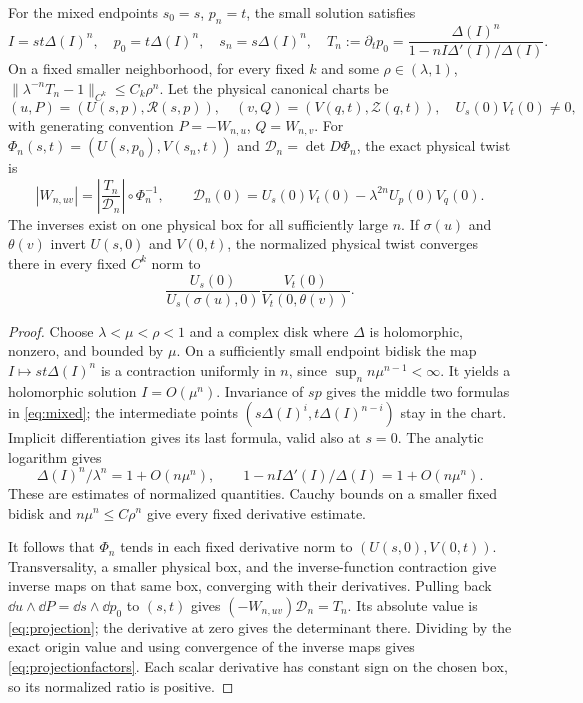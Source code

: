 \begin{proposition}\label{prop:normalform}
For the mixed endpoints $s_0=s$, $p_n=t$, the small solution satisfies
\begin{equation}\label{eq:mixed}
 I=st\Delta(I)^n,\quad p_0=t\Delta(I)^n,\quad
 s_n=s\Delta(I)^n,\quad
 T_n:=\partial_t p_0=
 \frac{\Delta(I)^n}{1-nI\Delta'(I)/\Delta(I)}.
\end{equation}
On a fixed smaller neighborhood, for every fixed $k$ and some
$\rho\in(\lambda,1)$,
$\|\lambda^{-n}T_n-1\|_{C^k}\le C_k\rho^n$.
Let the physical canonical charts be
\[
 (u,P)=(U(s,p),\mathcal R(s,p)),\quad
 (v,Q)=(V(q,t),\mathcal Z(q,t)),\quad U_s(0)V_t(0)\ne0,
\]
with generating convention $P=-W_{n,u}$, $Q=W_{n,v}$.
For $\Phi_n(s,t)=(U(s,p_0),V(s_n,t))$ and
$\mathcal D_n=\det D\Phi_n$, the exact physical twist is
\begin{equation}\label{eq:projection}
 |W_{n,uv}|=\left|\frac{T_n}{\mathcal D_n}\right|
                       \circ\Phi_n^{-1},\qquad
 \mathcal D_n(0)=U_s(0)V_t(0)-\lambda^{2n}U_p(0)V_q(0).
\end{equation}
The inverses exist on one physical box for all sufficiently large $n$.
If $\sigma(u)$ and $\theta(v)$ invert $U(s,0)$ and $V(0,t)$,
the normalized physical twist converges there in every fixed $C^k$
norm to
\begin{equation}\label{eq:projectionfactors}
 \frac{U_s(0)}{U_s(\sigma(u),0)}
             \frac{V_t(0)}{V_t(0,\theta(v))}.
\end{equation}
\end{proposition}
\begin{proof}
Choose $\lambda<\mu<\rho<1$ and a complex disk where $\Delta$
is holomorphic, nonzero, and bounded by $\mu$. On a sufficiently small
endpoint bidisk the map $I\mapsto st\Delta(I)^n$ is a contraction
uniformly in $n$, since $\sup_n n\mu^{n-1}<\infty$.
It yields a holomorphic solution $I=O(\mu^n)$. Invariance of $sp$
gives the middle two formulas in \eqref{eq:mixed}; the intermediate
points $(s\Delta(I)^i,t\Delta(I)^{n-i})$ stay in the chart.
Implicit differentiation gives its last formula, valid also at $s=0$.
The analytic logarithm gives
\[
 \Delta(I)^n/\lambda^n=1+O(n\mu^n),\qquad
 1-nI\Delta'(I)/\Delta(I)=1+O(n\mu^n).
\]
These are estimates of normalized quantities. Cauchy bounds on a
smaller fixed bidisk and $n\mu^n\le C\rho^n$ give every fixed
derivative estimate.

It follows that $\Phi_n$ tends in each fixed derivative norm to
$(U(s,0),V(0,t))$. Transversality, a smaller physical box, and the
inverse-function contraction give inverse maps on that same box,
converging with their derivatives. Pulling back
$\dd u\wedge\dd P=\dd s\wedge\dd p_0$ to $(s,t)$ gives
$(-W_{n,uv})\mathcal D_n=T_n$. Its absolute value is
\eqref{eq:projection}; the derivative at zero gives the determinant
there. Dividing by the exact origin value and using convergence of the
inverse maps gives \eqref{eq:projectionfactors}. Each scalar derivative
has constant sign on the chosen box, so its normalized ratio is positive.
\end{proof}

